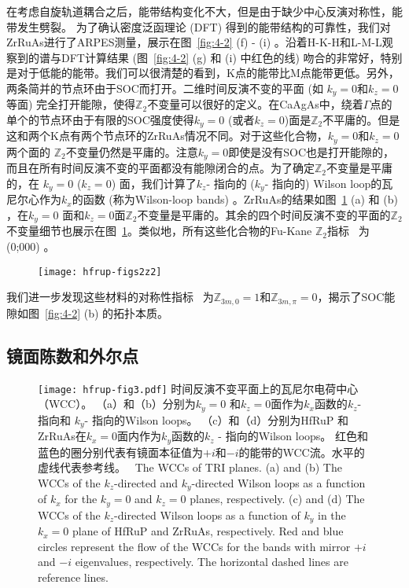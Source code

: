 在考虑自旋轨道耦合之后，能带结构变化不大，但是由于缺少中心反演对称性，能带发生劈裂。
为了确认密度泛函理论 (DFT) 得到的能带结构的可靠性，我们对ZrRuAs进行了ARPES测量，展示在图~\ref{fig:4-2} (f) - (i) 。沿着H-K-H和L-M-L观察到的谱与DFT计算结果 (图~\ref{fig:4-2} (g) 和 (i) 中红色的线) 吻合的非常好，特别是对于低能的能带。我们可以很清楚的看到，K点的能带比M点能带更低。另外，两条简并的节点环由于SOC而打开。二维时间反演不变的平面 (如 $k_y = 0$和$k_z = 0$等面) 完全打开能隙，使得$\mathbb Z_2$不变量可以很好的定义。在CaAgAs中，绕着$\Gamma$点的单个的节点环由于有限的SOC强度使得$k_y = 0$ (或者$k_z = 0$)面是$\mathbb Z_2$不平庸的。但是这和两个K点有两个节点环的ZrRuAs情况不同。对于这些化合物，$k_y = 0$和$k_z = 0$两个面的 $\mathbb Z_2$不变量仍然是平庸的。注意$k_y = 0$即使是没有SOC也是打开能隙的，而且在所有时间反演不变的平面都没有能隙闭合的点。为了确定$\mathbb Z_2$不变量是平庸的，在 $k_y = 0$ ($k_z = 0$) 面，我们计算了$k_z$- 指向的 ($k_y$- 指向的) Wilson loop的瓦尼尔心作为$k_x$的函数 (称为Wilson-loop bands) 。ZrRuAs的结果如图~\ref{hfrup-fig:s2} (a) 和 (b) ，在$k_y = 0$ 面和$k_z = 0$面$\mathbb Z_2$不变量是平庸的。其余的四个时间反演不变的平面的$\mathbb Z_2$不变量细节也展示在图~\ref{hfrup-fig:s2}。类似地，所有这些化合物的Fu-Kane $\mathbb Z_2$指标~\citep{Fu2007topo} 为 (0;000) 。

\begin{figure}[!htb]
    \centering
    \texttt{[image: hfrup-figs2z2]}
    \label{hfrup-fig:s2}
\end{figure}
    
我们进一步发现这些材料的对称性指标~\citep{nc_ashvin,song2017,Jorrit2017,zhang2019,wanxg2019} 为$\mathbb Z_{3m,0}=1$和$\mathbb Z_{3m,\pi}=0$，揭示了SOC能隙如图~\ref{fig:4-2} (b) 的拓扑本质。
    
      
\subsection{镜面陈数和外尔点}
\begin{figure}[!htbp]
    \centering
    \texttt{[image: hfrup-fig3.pdf]}
    \bicaption
    {时间反演不变平面上的瓦尼尔电荷中心（WCC）。
    （a）和（b）分别为$k_y = 0$ 和$k_z = 0$面作为$k_x$函数的$k_z$- 指向和 $k_y$- 指向的Wilson loops。
    （c）和（d）分别为HfRuP 和 ZrRuAs在$k_x = 0$面内作为$k_y$函数的$k_z$ - 指向的Wilson loops。
    红色和蓝色的圈分别代表有镜面本征值为$+i$和$-i$的能带的WCC流。水平的虚线代表参考线。~\citep{qian2019npj}
    }
    {The WCCs of TRI planes.
    (a) and (b) The WCCs of the $k_z$-directed and $k_y$-directed Wilson loops as a function of $k_x$ for the $k_y = 0$ and $k_z = 0$ planes, respectively.
    (c) and (d) The WCCs of the $k_z$-directed Wilson loops as a function of $k_y$ in the $k_x = 0$ plane of HfRuP and ZrRuAs, respectively.
    Red and blue circles represent the flow of the WCCs for the bands with mirror $+i$ and $-i$ eigenvalues, respectively.
    The horizontal dashed lines are reference lines. ~\citep{qian2019npj}}
    \label{fig:4-3}
\end{figure}    
    
